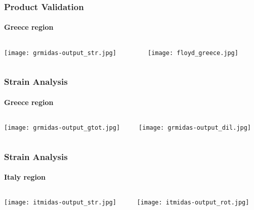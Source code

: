 \begin{frame}
 \frametitle{Product Validation}
 \framesubtitle{Greece region}
 \label{ch4:}
   
  \begin{columns}
    \begin{column}{0.5\textwidth}
      
      \texttt{[image: grmidas-output\_str.jpg]}   
    \end{column}
    \begin{column}{0.5\textwidth}
    \begin{center}
      
      \texttt{[image: floyd\_greece.jpg]}     
    \end{center}
    \end{column}
  \end{columns}

\end{frame}
\note{}

\begin{frame}
 \frametitle{Strain Analysis}
 \framesubtitle{Greece region}
 \label{ch4:}
   
  \begin{columns}
    \begin{column}{0.5\textwidth}
      \texttt{[image: grmidas-output\_gtot.jpg]}   
    \end{column}
    \begin{column}{0.5\textwidth}
    \begin{center}
      \texttt{[image: grmidas-output\_dil.jpg]}     
    \end{center}
    \end{column}
  
  \end{columns}

\end{frame}
\note{}


\begin{frame}
 \frametitle{Strain Analysis}
 \framesubtitle{Italy region}
 \label{ch4:}
   
  \begin{columns}
    \begin{column}{0.5\textwidth}
      
      \texttt{[image: itmidas-output\_str.jpg]}   
    \end{column}
    \begin{column}{0.5\textwidth}
    \begin{center}
      
      \texttt{[image: itmidas-output\_rot.jpg]}     
    \end{center}
    \end{column}
  \end{columns}

\end{frame}
\note{}

